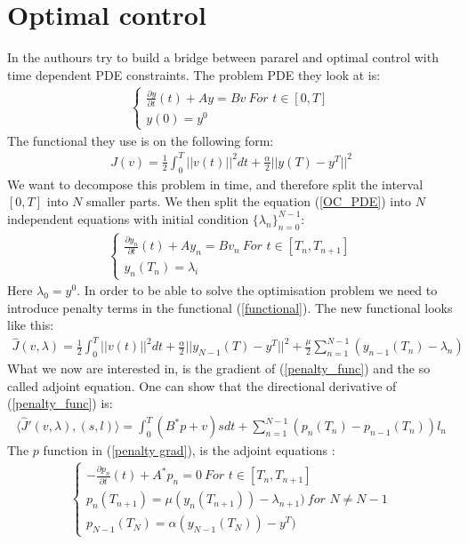 \documentclass[11pt,a4paper]{article}
\begin{document}
\section{Optimal control}
In \cite{maday2002parareal} the authours try to build a bridge between pararel and optimal control with time dependent PDE constraints. The problem PDE they look at is:
\begin{align}
\left\{
     \begin{array}{lr}
		\frac{\partial y}{\partial t}(t)+Ay=Bv  \ \textit{For $t \in [0,T]$}\\
		y(0)=y^0
	\end{array}
\right. \label{OC_PDE}
\end{align}
The functional they use is on the following form:
\begin{align}
J(v) = \frac{1}{2}\int_0^T ||v(t)||^2 dt + \frac{\alpha}{2}||y(T)-y^T||^2 \label{functional}
\end{align} 
We want to decompose this problem in time, and therefore split the interval $[0,T]$ into $N$ smaller parts. We then split the equation (\ref{OC_PDE}) into $N$ independent equations with initial condition $\{\lambda_n\}_{n=0}^{N-1}$:
\begin{align}
\left\{
     \begin{array}{lr}
		\frac{\partial y_n}{\partial t}(t)+Ay_n=Bv_n  \ \textit{For $t \in [T_n,T_{n+1}]$}\\
		y_{n}(T_n)=\lambda_i
	\end{array}
\right. \label{OC_PPDE}
\end{align} 
Here $\lambda_0=y^0$. In order to be able to solve the optimisation problem we need to introduce penalty terms in the functional (\ref{functional}). The new functional looks like this:
\begin{align}
\hat{J}(v,\lambda) = \frac{1}{2}\int_0^T ||v(t)||^2 dt + \frac{\alpha}{2}||y_{N-1}(T)-y^T||^2 + \frac{\mu}{2}\sum_{n=1}^{N-1} (y_{n-1}(T_{n})-\lambda_{n}) \label{penalty_func}
\end{align} 
What we now are interested in, is the gradient of (\ref{penalty_func}) and the so called adjoint equation. One can show that the directional derivative of (\ref{penalty_func}) is:
\begin{align}
\langle\hat{J}'(v,\lambda),(s,l) \rangle = \int_0^T (B^*p+v)sdt + \sum_{n=1}^{N-1}(p_n(T_n) - p_{n-1}(T_n))l_n
\end{align} \label{penalty grad}
The $p$ function in (\ref{penalty grad}), is the adjoint equations :
\begin{align}
\left\{
     \begin{array}{lr}
		-\frac{\partial p_n}{\partial t}(t)+A^*p_n=0  \ \textit{For $t \in [T_n,T_{n+1}]$}\\
		p_{n}(T_{n+1}) = \mu(y_n(T_{n+1})) -\lambda_{n+1}) \ \textit{for $N\neq N-1$} \\
		p_{N-1}(T_N)=\alpha(y_{N-1}(T_{N}))-y^T) 
	\end{array}
\right. 
\end{align}\label{adjoints}
\end{document}
